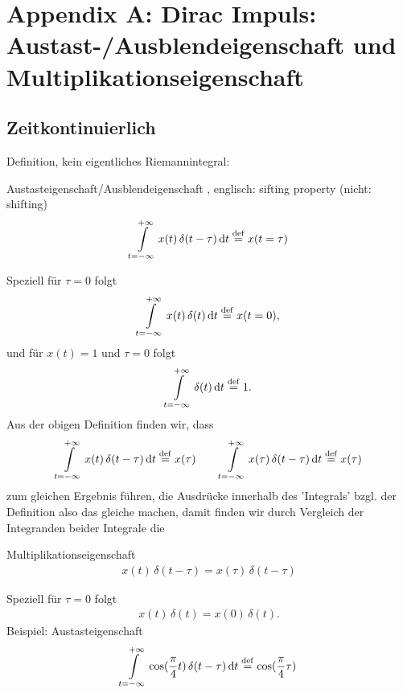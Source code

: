 \clearpage
\section{Appendix A: Dirac Impuls: Austast-/Ausblendeigenschaft und Multiplikationseigenschaft}
%
\subsection{Zeitkontinuierlich}
Definition, kein eigentliches Riemannintegral:
\begin{mdframed}
Austasteigenschaft/Ausblendeigenschaft , englisch: sifting property (nicht: shifting)
\begin{align}
\int\limits_{t=-\infty}^{+\infty} x(t) \, \delta(t-\tau) \, \mathrm{d} t \stackrel{\mathrm{def}}= x(t=\tau)
\label{eq:AppA_SifitingCT}
\end{align}
\end{mdframed}
Speziell für $\tau=0$ folgt
\begin{align}
\int\limits_{t=-\infty}^{+\infty} x(t) \, \delta(t) \, \mathrm{d} t \stackrel{\mathrm{def}}= x(t=0),
\end{align}
und für $x(t)=1$ und $\tau=0$ folgt
\begin{align}
\int\limits_{t=-\infty}^{+\infty} \delta(t) \, \mathrm{d} t \stackrel{\mathrm{def}}= 1.
\end{align}
Aus der obigen Definition finden wir, dass
\begin{align}
\int\limits_{t=-\infty}^{+\infty} x(t) \, \delta(t-\tau) \, \mathrm{d} t \stackrel{\mathrm{def}}= x(\tau)\qquad
\int\limits_{t=-\infty}^{+\infty} x(\tau) \, \delta(t-\tau) \, \mathrm{d} t \stackrel{\mathrm{def}}= x(\tau)
\end{align}
zum gleichen Ergebnis führen, die Ausdrücke innerhalb des 'Integrals' bzgl.
der Definition also das gleiche machen, damit finden wir durch Vergleich der Integranden beider Integrale die
\begin{mdframed}
Multiplikationseigenschaft
\begin{align}
x(t) \, \delta(t-\tau) = x(\tau) \, \delta(t-\tau)
\end{align}
\end{mdframed}
Speziell für $\tau=0$ folgt
\begin{align}
x(t) \, \delta(t) = x(0) \, \delta(t).
\end{align}
%
Beispiel:
Austasteigenschaft
\begin{align}
\int\limits_{t=-\infty}^{+\infty} \cos(\frac{\pi}{4} t) \, \delta(t-\tau) \, \mathrm{d} t \stackrel{\mathrm{def}}=\cos(\frac{\pi}{4} \tau)
\end{align}
